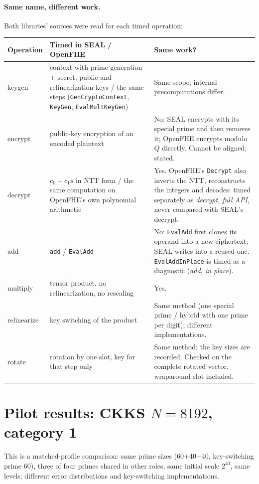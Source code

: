\documentclass[11pt]{article}
\begin{document}
\paragraph{Same name, different work.} Both libraries' sources were read for each timed operation:
\begin{center}\footnotesize
\begin{tabular}{@{}L{2.0cm}L{6.4cm}L{7.6cm}@{}}
\toprule
\textbf{Operation} & \textbf{Timed in SEAL / OpenFHE} & \textbf{Same work?} \\
\midrule
keygen & context with prime generation + secret, public and relinearization keys / the same steps (\texttt{GenCryptoContext}, \texttt{KeyGen}, \texttt{EvalMultKeyGen}) & Same scope; internal precomputations differ. \\
encrypt & public-key encryption of an encoded plaintext & No: SEAL encrypts with its special prime and then removes it; OpenFHE encrypts modulo $Q$ directly. Cannot be aligned; stated. \\
decrypt & $c_0 + c_1 s$ in NTT form / the same computation on OpenFHE's own polynomial arithmetic & Yes. OpenFHE's \texttt{Decrypt} also inverts the NTT, reconstructs the integers and decodes: timed separately as \emph{decrypt, full API}, never compared with SEAL's decrypt. \\
add & \texttt{add} / \texttt{EvalAdd} & No: \texttt{EvalAdd} first clones its operand into a new ciphertext; SEAL writes into a reused one. \texttt{EvalAddInPlace} is timed as a diagnostic (\emph{add, in place}). \\
multiply & tensor product, no relinearization, no rescaling & Yes. \\
relinearize & key switching of the product & Same method (one special prime / hybrid with one prime per digit); different implementations. \\
rotate & rotation by one slot, key for that step only & Same method; the key sizes are recorded. Checked on the complete rotated vector, wraparound slot included. \\
\bottomrule
\end{tabular}
\end{center}

\section{Pilot results: CKKS \texorpdfstring{$N{=}8192$}{N=8192}, category 1}
\label{sec:results}

This is a matched-profile comparison: same prime sizes (60+40+40, key-switching prime 60), three of four primes shared in other roles, same initial scale $2^{40}$, same levels; different error distributions and key-switching implementations.
\end{document}
